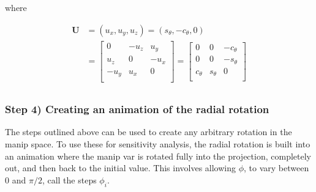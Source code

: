 \noindent where

\begin{align*}
  \textbf{U} &= (u_x, u_y, u_z) =
  (s_\theta, -c_\theta, 0) \\ 
  &=
  \begin{bmatrix}
  0 & -u_z & u_y  \\
  u_z & 0 & -u_x \\
  -u_y & u_x & 0 \\
  \end{bmatrix} =
  \begin{bmatrix}
    0 & 0 & -c_\theta \\
    0 & 0 & -s_\theta \\
    c_\theta & s_\theta & 0 \\
  \end{bmatrix} \\
  \end{align*}

\hypertarget{step-4-creating-an-animation-of-the-radial-rotation}{%
\subsubsection{Step 4) Creating an animation of the radial
rotation}\label{step-4-creating-an-animation-of-the-radial-rotation}}

The steps outlined above can be used to create any arbitrary rotation in
the manip space. To use these for sensitivity analysis, the radial
rotation is built into an animation where the manip var is rotated fully
into the projection, completely out, and then back to the initial value.
This involves allowing \(\phi\), to vary between 0 and \(\pi/2\), call
the steps \(\phi_i\).

